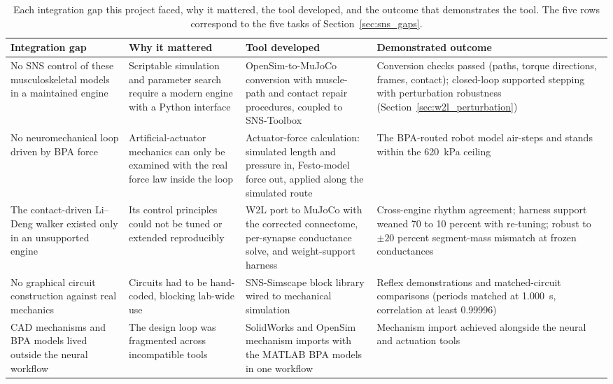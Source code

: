 \begin{table}[htbp]
\caption[Integration gaps and the tools that closed them]{Each integration gap this project faced, why it mattered, the tool developed, and the outcome that demonstrates the tool. The five rows correspond to the five tasks of Section~\ref{sec:sns_gaps}.}
\label{tab:sns_capability}
\small
\begin{tabularx}{\textwidth}{@{}>{\raggedright\arraybackslash}p{}>{\raggedright\arraybackslash}p{}>{\raggedright\arraybackslash}p{}>{\raggedright\arraybackslash}X@{}}
\toprule
\textbf{Integration gap} & \textbf{Why it mattered} & \textbf{Tool developed} & \textbf{Demonstrated outcome} \\
\midrule
No SNS control of these musculoskeletal models in a maintained engine & Scriptable simulation and parameter search require a modern engine with a Python interface & OpenSim-to-MuJoCo conversion with muscle-path and contact repair procedures, coupled to SNS-Toolbox & Conversion checks passed (paths, torque directions, frames, contact); closed-loop supported stepping with perturbation robustness (Section~\ref{sec:w2l_perturbation}) \\
No neuromechanical loop driven by BPA force & Artificial-actuator mechanics can only be examined with the real force law inside the loop & Actuator-force calculation: simulated length and pressure in, Festo-model force out, applied along the simulated route & The BPA-routed robot model air-steps and stands within the \qty{620}{\kPa} ceiling \\
The contact-driven Li--Deng walker existed only in an unsupported engine & Its control principles could not be tuned or extended reproducibly & W2L port to MuJoCo with the corrected connectome, per-synapse conductance solve, and weight-support harness & Cross-engine rhythm agreement; harness support weaned 70 to 10 percent with re-tuning; robust to $\pm 20$ percent segment-mass mismatch at frozen conductances \\
No graphical circuit construction against real mechanics & Circuits had to be hand-coded, blocking lab-wide use & SNS-Simscape block library wired to mechanical simulation & Reflex demonstrations and matched-circuit comparisons (periods matched at \qty{1.000}{\second}, correlation at least 0.99996) \\
CAD mechanisms and BPA models lived outside the neural workflow & The design loop was fragmented across incompatible tools & SolidWorks and OpenSim mechanism imports with the MATLAB BPA models in one workflow & Mechanism import achieved alongside the neural and actuation tools \\
\bottomrule
\end{tabularx}
\end{table}

